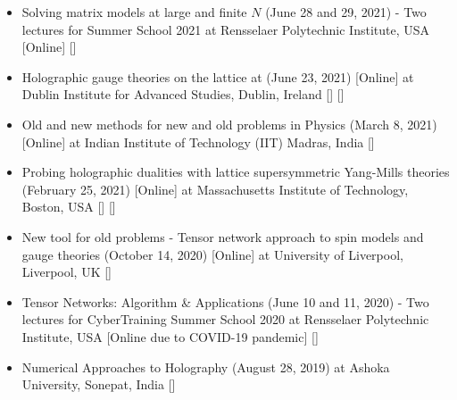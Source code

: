 \begin{itemize}
 \item Solving matrix models at large and finite $N$ (June 28 and 29, 2021) - Two lectures for 
Summer School 2021 at Rensselaer Polytechnic Institute, USA [Online]  
  [] \vspace{1mm} 
 
 \item Holographic gauge theories on the lattice at 
 (June 23, 2021) [Online] at Dublin Institute for Advanced Studies, Dublin, Ireland 
  []  [] 
  \vspace{1mm} 
  
 \item Old and new methods for new and old problems in Physics
 (March 8, 2021) [Online] at Indian Institute of Technology (IIT) Madras, India
  [] 
\vspace{1mm} 
 
 \item Probing holographic dualities with lattice supersymmetric Yang-Mills theories 
 (February 25, 2021) [Online] at Massachusetts Institute of Technology, Boston, USA 
   []  [] 
 \vspace{1mm} 
 
 \item New tool for old problems - Tensor network approach to spin models and gauge theories 
 (October 14, 2020) [Online] at University of Liverpool, Liverpool, UK
  [] 
 \vspace{1mm} 
  
 \item Tensor Networks: Algorithm \& Applications (June 10 and 11, 2020) - Two lectures for 
 CyberTraining Summer School 2020 at Rensselaer Polytechnic Institute, USA [Online due to COVID-19 pandemic]  
   []  
\vspace{1mm} 

 \item Numerical Approaches to Holography (August 28, 2019) at Ashoka University, Sonepat, India [] 
\vspace{1mm} 
 

\end{itemize}

